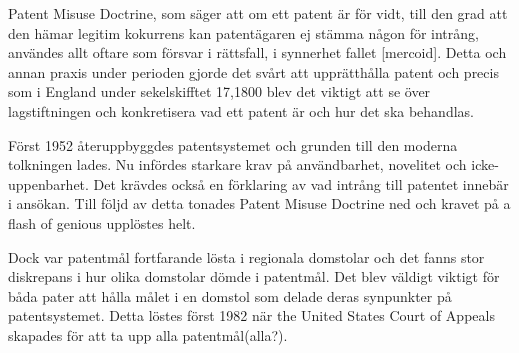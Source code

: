  

Patent Misuse Doctrine, som säger att om ett patent är för vidt, till den grad att den hämar legitim kokurrens kan patentägaren ej stämma någon för intrång, användes allt oftare som försvar i rättsfall, i synnerhet fallet [mercoid]. Detta och annan praxis under perioden gjorde det svårt att upprätthålla patent och precis som i England under sekelskifftet 17,1800  blev det viktigt att se över lagstiftningen och konkretisera vad ett patent är och hur det ska behandlas.

Först 1952 återuppbyggdes patentsystemet och grunden till den moderna tolkningen lades. Nu infördes starkare krav på användbarhet, novelitet och icke-uppenbarhet. Det krävdes också en förklaring av vad intrång till patentet innebär i ansökan. Till följd av detta tonades Patent Misuse Doctrine ned och kravet på a flash of genious upplöstes helt.

Dock var patentmål fortfarande lösta i regionala domstolar och det fanns stor diskrepans i hur olika domstolar dömde i patentmål. Det blev väldigt viktigt för båda pater att hålla målet i en domstol som delade deras synpunkter på patentsystemet. Detta löstes först 1982 när the United States Court of Appeals skapades för att ta upp alla patentmål(alla?).

